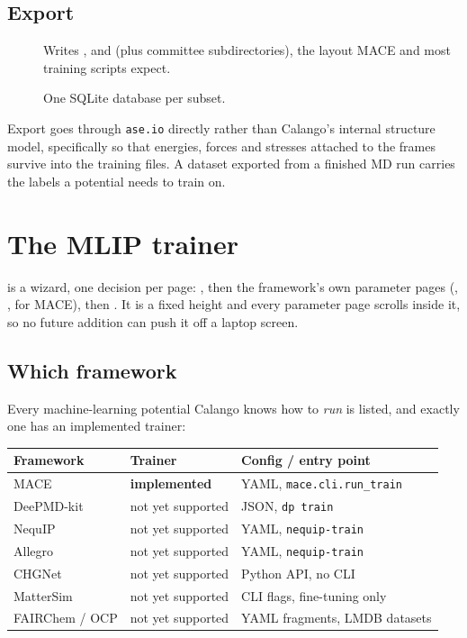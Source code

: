 \subsection{Export}

\begin{description}
  \item[] Writes ,
     and  (plus committee
    subdirectories), the layout MACE and most training scripts expect.
  \item[] One SQLite database per subset.
\end{description}

\begin{calnote}
Export goes through \texttt{ase.io} directly rather than Calango's internal
structure model, specifically so that energies, forces and stresses
attached to the frames survive into the training files. A dataset exported
from a finished MD run carries the labels a potential needs to train on.
\end{calnote}

\section{The MLIP trainer}
\label{sec:mlip-trainer}

\menusep{}\menusep{} is a wizard, one
decision per page: , then the framework's own parameter pages
(, ,  for MACE), then
. It is a fixed height and every parameter page
scrolls inside it, so no future addition can push it off a laptop screen.

\subsection{Which framework}

Every machine-learning potential Calango knows how to \emph{run} is listed,
and exactly one has an implemented trainer:

\begin{center}
\begin{tabular}{@{}lll@{}}
\toprule
Framework & Trainer & Config / entry point \\
\midrule
MACE           & \textbf{implemented} & YAML, \texttt{mace.cli.run\_train} \\
DeePMD-kit     & not yet supported    & JSON, \texttt{dp train} \\
NequIP         & not yet supported    & YAML, \texttt{nequip-train} \\
Allegro        & not yet supported    & YAML, \texttt{nequip-train} \\
CHGNet         & not yet supported    & Python API, no CLI \\
MatterSim      & not yet supported    & CLI flags, fine-tuning only \\
FAIRChem / OCP & not yet supported    & YAML fragments, LMDB datasets \\
\bottomrule
\end{tabular}
\end{center}

